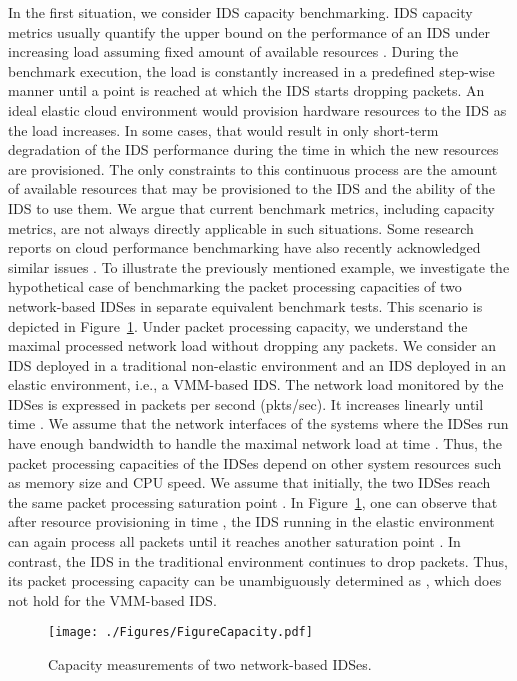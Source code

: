 In the first situation, we consider IDS capacity benchmarking. IDS capacity metrics usually quantify the upper bound on the performance of an IDS under increasing load assuming fixed amount of available resources \cite{hall:capacity}. During the benchmark execution, the load is constantly increased in a predefined step-wise manner until a point is reached at which the IDS starts dropping packets. An ideal elastic cloud environment would provision hardware resources to the IDS as the load increases. In some cases, that would result in only short-term degradation of the IDS performance during the time in which the new resources are provisioned. The only constraints to this continuous process are the amount of available resources that may be provisioned to the IDS and the ability of the IDS to use them. We argue that current benchmark metrics, including capacity metrics, are not always directly applicable in such situations. Some research reports on cloud performance benchmarking have also recently acknowledged similar issues \cite{binning:how}. To illustrate the previously mentioned example, we investigate the hypothetical case of benchmarking the packet processing capacities of two network-based IDSes in separate equivalent benchmark tests. This scenario is depicted in Figure~\ref{fig:idsCapacities}. Under packet processing capacity, we understand the maximal processed network load without dropping any packets.  We consider an IDS deployed in a traditional non-elastic environment and an IDS deployed in an elastic environment, i.e., a VMM-based IDS.  The network load monitored by the IDSes is expressed in packets per second (pkts/sec). It increases linearly until time . We assume that the network interfaces of the systems where the IDSes run have enough bandwidth to handle the maximal network load at time . Thus, the packet processing capacities of the IDSes depend on other system resources such as memory size and CPU speed.  We assume that initially, the two IDSes reach the same packet processing saturation point . In Figure~\ref{fig:idsCapacities}, one can observe that after resource provisioning in time , the IDS running in the elastic environment can again process all packets until it reaches another saturation point . In contrast, the IDS in the traditional environment continues to drop packets. Thus, its packet processing capacity can be unambiguously determined as , which does not hold for the VMM-based IDS.  

\begin{figure}
\centering
\texttt{[image: ./Figures/FigureCapacity.pdf]}
\caption{Capacity measurements of two network-based IDSes.}
\label{fig:idsCapacities}
\end{figure}

